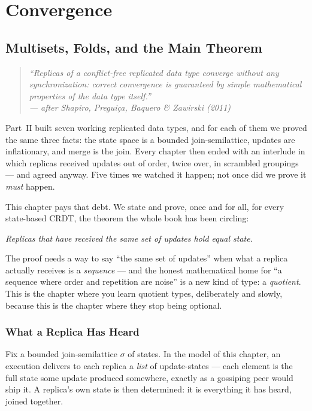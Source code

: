 \documentclass[12pt, a4paper, openright]{book}
\theoremstyle{thmstyle}
\theoremstyle{defstyle}
\begin{document}
\part{Convergence}

\chapter{Multisets, Folds, and the Main Theorem}
\label{ch:sec}

\begin{quote}
  \itshape
  ``Replicas of a conflict-free replicated data type converge without any
  synchronization: correct convergence is guaranteed by simple mathematical
  properties of the data type itself.''\\
  --- after Shapiro, Preguiça, Baquero \& Zawirski (2011)
\end{quote}

Part~II built seven working replicated data types, and for each of them we
proved the same three facts: the state space is a bounded join-semilattice,
updates are inflationary, and merge is the join. Every chapter then ended
with an interlude in which replicas received updates out of order, twice
over, in scrambled groupings --- and agreed anyway. Five times we watched it
happen; not once did we prove it \emph{must} happen.

This chapter pays that debt. We state and prove, once and for all, for every
state-based CRDT, the theorem the whole book has been circling:

\medskip
\emph{Replicas that have received the same set of updates hold equal state.}
\medskip

The proof needs a way to say ``the same set of updates'' when what a replica
actually receives is a \emph{sequence} --- and the honest mathematical home
for ``a sequence where order and repetition are noise'' is a new kind of type:
a \emph{quotient}. This is the chapter where you learn quotient types,
deliberately and slowly, because this is the chapter where they stop being
optional.

\section{What a Replica Has Heard}

Fix a bounded join-semilattice $\sigma$ of states. In the model of this
chapter, an execution delivers to each replica a \emph{list} of
update-states --- each element is the full state some update produced
somewhere, exactly as a gossiping peer would ship it. A replica's own state
is then determined: it is everything it has heard, joined together.
\end{document}
